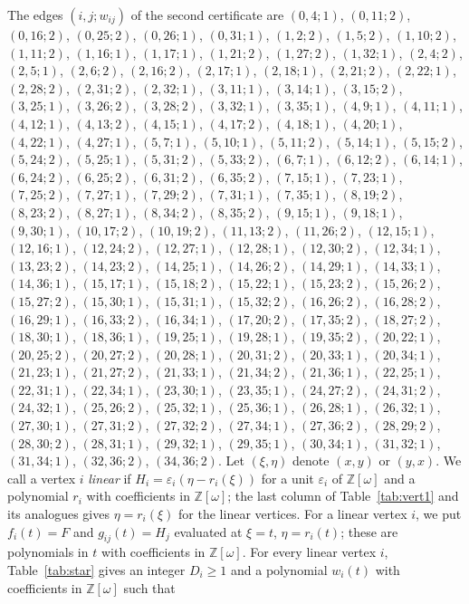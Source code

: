 \documentclass[11pt]{article}
\newcommand{\Z}{\mathbb{Z}}
\begin{document}
The edges $(i,j;w_{ij})$ of the second certificate are $(0,4;1)$, $(0,11;2)$, $(0,16;2)$, $(0,25;2)$, $(0,26;1)$, $(0,31;1)$, $(1,2;2)$, $(1,5;2)$, $(1,10;2)$, $(1,11;2)$, $(1,16;1)$, $(1,17;1)$, $(1,21;2)$, $(1,27;2)$, $(1,32;1)$, $(2,4;2)$, $(2,5;1)$, $(2,6;2)$, $(2,16;2)$, $(2,17;1)$, $(2,18;1)$, $(2,21;2)$, $(2,22;1)$, $(2,28;2)$, $(2,31;2)$, $(2,32;1)$, $(3,11;1)$, $(3,14;1)$, $(3,15;2)$, $(3,25;1)$, $(3,26;2)$, $(3,28;2)$, $(3,32;1)$, $(3,35;1)$, $(4,9;1)$, $(4,11;1)$, $(4,12;1)$, $(4,13;2)$, $(4,15;1)$, $(4,17;2)$, $(4,18;1)$, $(4,20;1)$, $(4,22;1)$, $(4,27;1)$, $(5,7;1)$, $(5,10;1)$, $(5,11;2)$, $(5,14;1)$, $(5,15;2)$, $(5,24;2)$, $(5,25;1)$, $(5,31;2)$, $(5,33;2)$, $(6,7;1)$, $(6,12;2)$, $(6,14;1)$, $(6,24;2)$, $(6,25;2)$, $(6,31;2)$, $(6,35;2)$, $(7,15;1)$, $(7,23;1)$, $(7,25;2)$, $(7,27;1)$, $(7,29;2)$, $(7,31;1)$, $(7,35;1)$, $(8,19;2)$, $(8,23;2)$, $(8,27;1)$, $(8,34;2)$, $(8,35;2)$, $(9,15;1)$, $(9,18;1)$, $(9,30;1)$, $(10,17;2)$, $(10,19;2)$, $(11,13;2)$, $(11,26;2)$, $(12,15;1)$, $(12,16;1)$, $(12,24;2)$, $(12,27;1)$, $(12,28;1)$, $(12,30;2)$, $(12,34;1)$, $(13,23;2)$, $(14,23;2)$, $(14,25;1)$, $(14,26;2)$, $(14,29;1)$, $(14,33;1)$, $(14,36;1)$, $(15,17;1)$, $(15,18;2)$, $(15,22;1)$, $(15,23;2)$, $(15,26;2)$, $(15,27;2)$, $(15,30;1)$, $(15,31;1)$, $(15,32;2)$, $(16,26;2)$, $(16,28;2)$, $(16,29;1)$, $(16,33;2)$, $(16,34;1)$, $(17,20;2)$, $(17,35;2)$, $(18,27;2)$, $(18,30;1)$, $(18,36;1)$, $(19,25;1)$, $(19,28;1)$, $(19,35;2)$, $(20,22;1)$, $(20,25;2)$, $(20,27;2)$, $(20,28;1)$, $(20,31;2)$, $(20,33;1)$, $(20,34;1)$, $(21,23;1)$, $(21,27;2)$, $(21,33;1)$, $(21,34;2)$, $(21,36;1)$, $(22,25;1)$, $(22,31;1)$, $(22,34;1)$, $(23,30;1)$, $(23,35;1)$, $(24,27;2)$, $(24,31;2)$, $(24,32;1)$, $(25,26;2)$, $(25,32;1)$, $(25,36;1)$, $(26,28;1)$, $(26,32;1)$, $(27,30;1)$, $(27,31;2)$, $(27,32;2)$, $(27,34;1)$, $(27,36;2)$, $(28,29;2)$, $(28,30;2)$, $(28,31;1)$, $(29,32;1)$, $(29,35;1)$, $(30,34;1)$, $(31,32;1)$, $(31,34;1)$, $(32,36;2)$, $(34,36;2)$.
Let $(\xi,\eta)$ denote $(x,y)$ or $(y,x)$. We call a vertex $i$ \emph{linear} if $H_i=\varepsilon_i(\eta-r_i(\xi))$ for a unit $\varepsilon_i$ of $\Z[\omega]$ and a polynomial $r_i$ with coefficients in $\Z[\omega]$; the last column of Table~\ref{tab:vert1} and its analogues gives $\eta=r_i(\xi)$ for the linear vertices. For a linear vertex $i$, we put $f_i(t)=F$ and $g_{ij}(t)=H_j$ evaluated at $\xi=t$, $\eta=r_i(t)$; these are polynomials in $t$ with coefficients in $\Z[\omega]$.
For every linear vertex $i$, Table~\ref{tab:star} gives an integer $D_i\geq1$ and a polynomial $w_i(t)$ with coefficients in $\Z[\omega]$ such that
\end{document}
